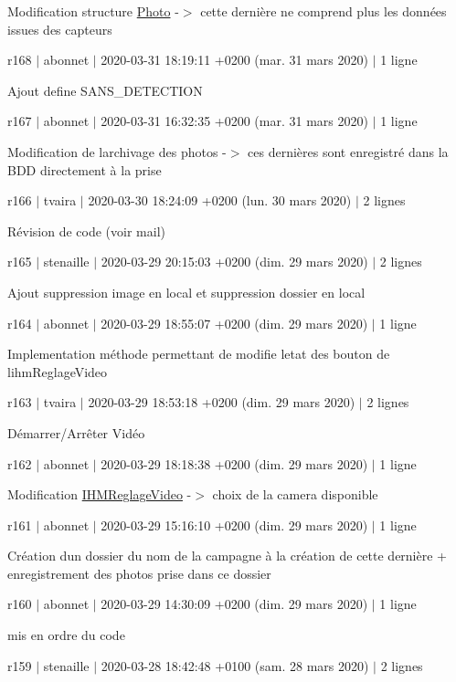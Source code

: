 Modification structure \hyperlink{struct_photo}{Photo} -\/$>$ cette dernière ne comprend plus les données issues des capteurs

r168 $\vert$ abonnet $\vert$ 2020-\/03-\/31 18\+:19\+:11 +0200 (mar. 31 mars 2020) $\vert$ 1 ligne

Ajout define S\+A\+N\+S\+\_\+\+D\+E\+T\+E\+C\+T\+I\+ON

r167 $\vert$ abonnet $\vert$ 2020-\/03-\/31 16\+:32\+:35 +0200 (mar. 31 mars 2020) $\vert$ 1 ligne

Modification de l\textquotesingle{}archivage des photos -\/$>$ ces dernières sont enregistré dans la B\+DD directement à la prise

r166 $\vert$ tvaira $\vert$ 2020-\/03-\/30 18\+:24\+:09 +0200 (lun. 30 mars 2020) $\vert$ 2 lignes

Révision de code (voir mail)

r165 $\vert$ stenaille $\vert$ 2020-\/03-\/29 20\+:15\+:03 +0200 (dim. 29 mars 2020) $\vert$ 2 lignes

Ajout suppression image en local et suppression dossier en local

r164 $\vert$ abonnet $\vert$ 2020-\/03-\/29 18\+:55\+:07 +0200 (dim. 29 mars 2020) $\vert$ 1 ligne

Implementation méthode permettant de modifie l\textquotesingle{}etat des bouton de l\textquotesingle{}ihm\+Reglage\+Video

r163 $\vert$ tvaira $\vert$ 2020-\/03-\/29 18\+:53\+:18 +0200 (dim. 29 mars 2020) $\vert$ 2 lignes

Démarrer/\+Arrêter Vidéo

r162 $\vert$ abonnet $\vert$ 2020-\/03-\/29 18\+:18\+:38 +0200 (dim. 29 mars 2020) $\vert$ 1 ligne

Modification \hyperlink{class_i_h_m_reglage_video}{I\+H\+M\+Reglage\+Video} -\/$>$ choix de la camera disponible

r161 $\vert$ abonnet $\vert$ 2020-\/03-\/29 15\+:16\+:10 +0200 (dim. 29 mars 2020) $\vert$ 1 ligne

Création d\textquotesingle{}un dossier du nom de la campagne à la création de cette dernière + enregistrement des photos prise dans ce dossier

r160 $\vert$ abonnet $\vert$ 2020-\/03-\/29 14\+:30\+:09 +0200 (dim. 29 mars 2020) $\vert$ 1 ligne

mis en ordre du code

r159 $\vert$ stenaille $\vert$ 2020-\/03-\/28 18\+:42\+:48 +0100 (sam. 28 mars 2020) $\vert$ 2 lignes

